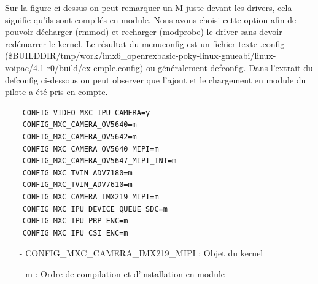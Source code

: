 Sur la figure ci-dessus on peut remarquer un M juste devant les drivers, cela signifie qu’ils
sont compilés en module. Nous avons choisi cette option afin de pouvoir décharger
(rmmod) et recharger (modprobe) le driver sans devoir redémarrer le kernel.
Le résultat du menuconfig est un fichier texte .config
(\$BUILDDIR/tmp/work/imx6\_openrexbasic-poky-linux-gnueabi/linux-voipac/4.1-r0/build/ex
emple.config) ou généralement defconfig. Dans l’extrait du defconfig ci-dessous on peut
observer que l’ajout et le chargement en module du pilote a été pris en compte.

\begin{lstlisting}
    CONFIG_VIDEO_MXC_IPU_CAMERA=y
    CONFIG_MXC_CAMERA_OV5640=m
    CONFIG_MXC_CAMERA_OV5642=m
    CONFIG_MXC_CAMERA_OV5640_MIPI=m
    CONFIG_MXC_CAMERA_OV5647_MIPI_INT=m
    CONFIG_MXC_TVIN_ADV7180=m
    CONFIG_MXC_TVIN_ADV7610=m
    CONFIG_MXC_CAMERA_IMX219_MIPI=m
    CONFIG_MXC_IPU_DEVICE_QUEUE_SDC=m
    CONFIG_MXC_IPU_PRP_ENC=m
    CONFIG_MXC_IPU_CSI_ENC=m
\end{lstlisting}

\begin{itemize}
    \item[-] CONFIG\_MXC\_CAMERA\_IMX219\_MIPI : Objet du kernel
    \item[-] m : Ordre de compilation et d'installation en module
\end{itemize}

